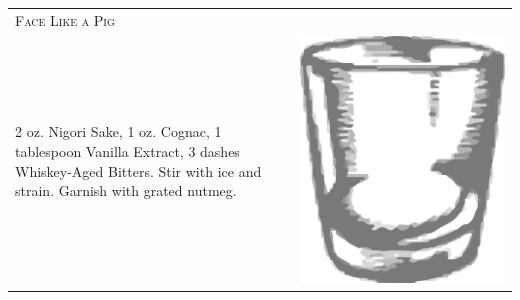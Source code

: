 \documentclass{article}
\begin{document}
\begin{tabular}{p{2in} p{0.5in}}
 	\multicolumn{2}{p{3in}}{\centering\Huge\textsc{Face Like a Pig}} \\ 
	  \vspace{-0.1in}2 oz. Nigori Sake, 1 oz. Cognac, 1 tablespoon Vanilla Extract, 3 dashes Whiskey-Aged Bitters. Stir with ice and strain. Garnish with grated nutmeg. &
   \vspace{-0.1in} \includegraphics{rocks_glass.png}
\end{tabular}
\end{document}
